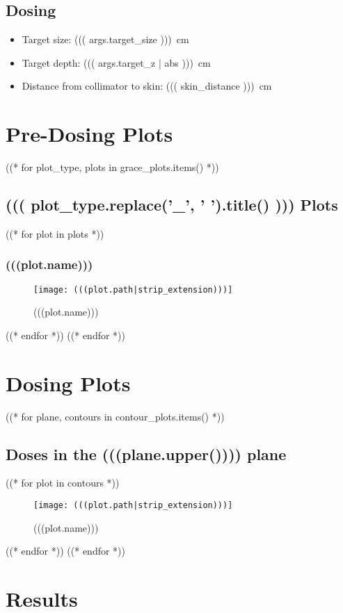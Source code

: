 \documentclass[12pt]{article}
\begin{document}
\subsection{Dosing}
\begin{itemize}
	\item Target size: \SI{((( args.target_size )))}{\cm}
	\item Target depth: \SI{((( args.target_z | abs )))}{\cm}
	\item Distance from collimator to skin: \SI{((( skin_distance )))}{\cm}
\end{itemize}
	
\section{Pre-Dosing Plots}
((* for plot_type, plots in grace_plots.items() *))
	\subsection{((( plot_type.replace('_', ' ').title() ))) Plots}
		((* for plot in plots *))
			\subsubsection{(((plot.name)))}
			\begin{figure}[H]
			\centering
			\texttt{[image: (((plot.path|strip\_extension)))]}
			\caption{(((plot.name)))}
			\label{fig:(((plot.slug)))}
			\end{figure}
		((* endfor *))
((* endfor *))

\section{Dosing Plots}


((* for plane, contours in contour_plots.items() *))
	\subsection{Doses in the (((plane.upper()))) plane}
	((* for plot in contours *))
	\begin{figure}[H]
	\centering
	\texttt{[image: (((plot.path|strip\_extension)))]}
	\caption{(((plot.name)))}
	\end{figure}
	((* endfor *))
((* endfor *))

\section{Results}
\end{document}
